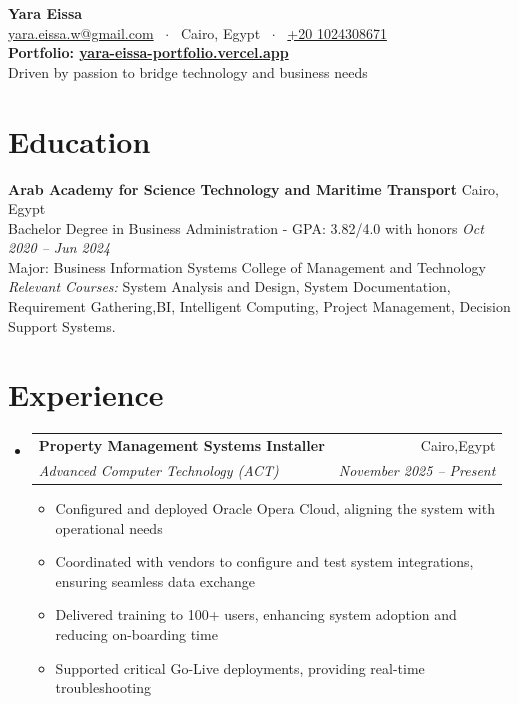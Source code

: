 \documentclass[a4paper,10pt]{article}
\makeatletter
\newcommand{\resumeSubheading}[4]{%
  \vspace{-1pt}\item
    \begin{tabular*}{0.97\textwidth}{l@{\extracolsep{\fill}}r}
      \textbf{#1} & #2 \\
      \textit{#3} & \textit{#4} \\
    \end{tabular*}\vspace{-5pt}}
\newcommand{\resumeSubHeadingListStart}{\begin{itemize}[leftmargin=*,itemsep=6pt,topsep=0pt]}
\newcommand{\resumeSubHeadingListEnd}{\end{itemize}}
\newcommand{\resumeItemListStart}{\begin{itemize}[label=--,itemsep=0pt,topsep=4pt]}
\newcommand{\resumeItemListEnd}{\end{itemize}\vspace{-5pt}}
\makeatother
\begin{document}
\begin{center}
  {\LARGE \textbf{Yara Eissa}} \\[4pt]
  \small
  \href{mailto:yara.eissa.w@gmail.com}{yara.eissa.w@gmail.com} ~$\cdot$~
  Cairo, Egypt ~$\cdot$~
  \href{tel:+201024308671}{+20 1024308671} \\[5pt]
  \normalsize
  \textbf{Portfolio: \href{https://yara-eissa-portfolio.vercel.app}{yara-eissa-portfolio.vercel.app}} \\[10pt]
  Driven by passion to bridge technology and business needs
\end{center}

\section{Education}
  \textbf{Arab Academy for Science Technology and Maritime Transport} \hfill Cairo, Egypt \\
  Bachelor Degree in Business Administration - GPA: 3.82/4.0 with honors \hfill \textit{Oct 2020 -- Jun 2024} \\[3pt]
  Major: Business Information Systems College of Management and Technology \\[5pt]
  \textit{Relevant Courses:} System Analysis and Design, System Documentation, Requirement Gathering,BI, Intelligent Computing, Project Management, Decision Support Systems.

\section{Experience}
  \resumeSubHeadingListStart
    \resumeSubheading
      {Property Management Systems Installer}{Cairo,Egypt}
      {Advanced Computer Technology (ACT)}{November 2025 -- Present}
      \resumeItemListStart
        \item Configured and deployed Oracle Opera Cloud, aligning the system with operational needs
        \item Coordinated with vendors to configure and test system integrations, ensuring seamless data exchange
        \item Delivered training to 100+ users, enhancing system adoption and reducing on-boarding time
        \item Supported critical Go-Live deployments, providing real-time troubleshooting
      \resumeItemListEnd
  \resumeSubHeadingListEnd
\end{document}
